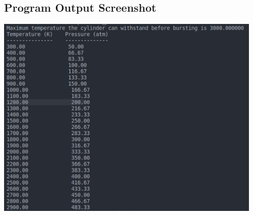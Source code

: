 	\subsection{{Program Output Screenshot}}
	
		{}
		
		\includegraphics[width=12.75cm]{temp-pres.png}
		
		
		